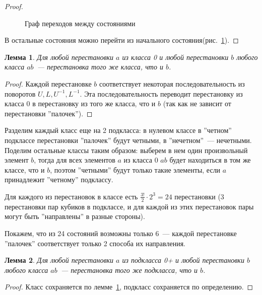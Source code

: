 \documentclass[utf8,a4paper,12pt]{article}
\newtheorem{lemma_cub}{Лемма}[section]
\begin{document}
\begin{proof}
\begin{figure}[ht]
\caption{Граф переходов между состояниями\label{states_graph}}
\end{figure}
В остальные состояния можно перейти из начального состояния(рис.~\ref{states_graph}).
\end{proof}
\begin{lemma_cub}
	Для любой перестановки $a$ из класса 0 и любой перестановки $b$ любого класса $ab$~--- перестановка того же класса, что и $b$.\label{lemma_superclasses}
\end{lemma_cub}
\begin{proof}
	Каждой перестановке $b$ соответствует некоторая последовательность из поворотов $U,L,U^{-1},L^{-1}$. Эта последовательность переводит перестановку из класса 0 в перестановку из того же класса, что и $b$ (так как не зависит от перестановки ''палочек'').
\end{proof}
Разделим каждый класс еще на 2 подкласса: в нулевом классе в ''четном'' подклассе перестановки ''палочек''  будут четными, в ''нечетном''~--- нечетными.
Поделим остальные классы таким образом: выберем в нем один произвольный элемент $b$, тогда для всех элементов $a$ из класса 0 $ab$ будет находиться в том же классе, что и $b$, поэтом ''четными'' будут только такие элементы, если $a$ принадлежит ''четному'' подклассу.

Для каждого из перестановок в классе есть $\frac{3!}{2}\cdot 2^3=24$ перестановки  (3 перестановки пар кубиков в подклассе, и для каждой из этих перестановок пары могут быть ''направлены'' в разные стороны).

Покажем, что из 24 состояний возможны только 6~--- каждой перестановке ''палочек'' соответствует только 2 способа их направления.
\begin{lemma_cub}
	Для любой перестановки $a$ из подкласса 0+ и любой перестановки $b$ любого класса $ab$~--- перестановка того же подкласса, что и $b$.\label{lemma_classes}
\end{lemma_cub}
\begin{proof}
Класс сохраняется по лемме~\ref{lemma_superclasses}, подкласс сохраняется по определению.
\end{proof}
\end{document}
